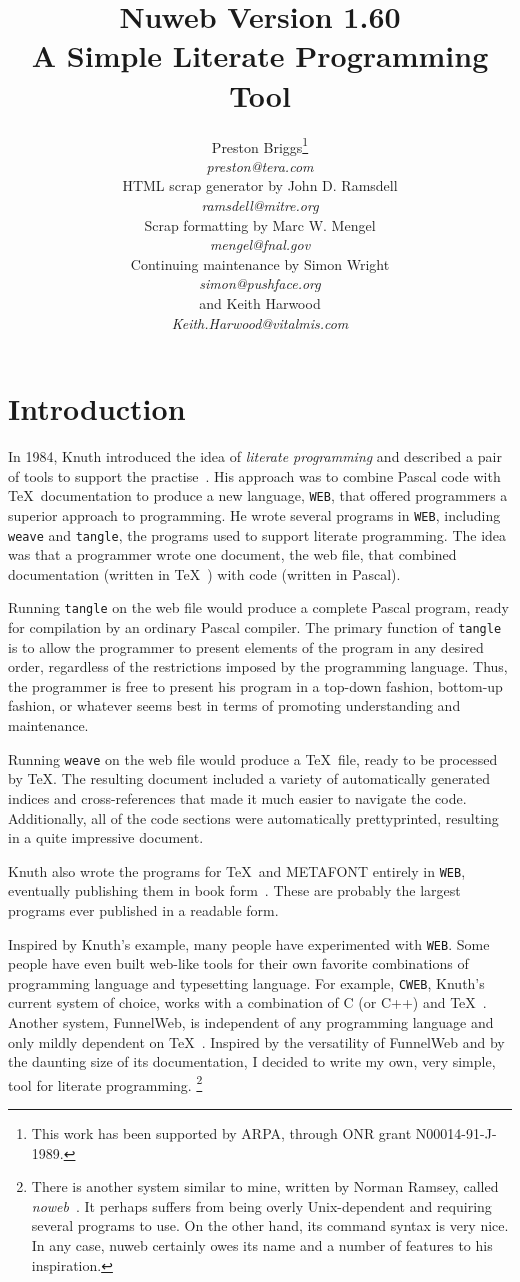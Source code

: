 \documentclass[a4paper]{report}
\title{Nuweb Version 1.60 \\ A Simple Literate Programming Tool}
\date{}
\author{Preston Briggs\thanks{This work has been supported by ARPA,
through ONR grant N00014-91-J-1989.}
\\ {\sl preston@tera.com}
\\ HTML scrap generator by John D. Ramsdell
\\ {\sl ramsdell@mitre.org}
\\ Scrap formatting by Marc W. Mengel
\\ {\sl mengel@fnal.gov}
\\ Continuing maintenance by Simon Wright
\\ {\sl simon@pushface.org}
\\ and Keith Harwood
\\ {\sl Keith.Harwood@vitalmis.com}}
\begin{document}
\maketitle
\tableofcontents

\chapter{Introduction}

In 1984, Knuth introduced the idea of {\em literate programming\/} and
described a pair of tools to support the practise~\cite{Knuth:CJ-27-2-97}.
His approach was to combine Pascal code with \TeX\ documentation to
produce a new language, \verb|WEB|, that offered programmers a superior
approach to programming. He wrote several programs in \verb|WEB|,
including \verb|weave| and \verb|tangle|, the programs used to support
literate programming.
The idea was that a programmer wrote one document, the web file, that
combined documentation (written in \TeX~\cite{Knuth:ct-a}) with code
(written in Pascal).

Running \verb|tangle| on the web file would produce a complete
Pascal program, ready for compilation by an ordinary Pascal compiler.
The primary function of \verb|tangle| is to allow the programmer to
present elements of the program in any desired order, regardless of
the restrictions imposed by the programming language. Thus, the
programmer is free to present his program in a top-down fashion,
bottom-up fashion, or whatever seems best in terms of promoting
understanding and maintenance.

Running \verb|weave| on the web file would produce a \TeX\ file, ready
to be processed by \TeX\@. The resulting document included a variety of
automatically generated indices and cross-references that made it much
easier to navigate the code. Additionally, all of the code sections
were automatically prettyprinted, resulting in a quite impressive
document.

Knuth also wrote the programs for \TeX\ and {\small\sf METAFONT}
entirely in \verb|WEB|, eventually publishing them in book
form~\cite{Knuth:ct-b,Knuth:ct-d}. These are probably the
largest programs ever published in a readable form.

Inspired by Knuth's example, many people have experimented with
\verb|WEB|\@. Some people have even built web-like tools for their
own favorite combinations of programming language and typesetting
language. For example, \verb|CWEB|, Knuth's current system of choice,
works with a combination of C (or C++) and \TeX~\cite{Levy:TB8-1-12}.
Another system, FunnelWeb, is independent of any programming language
and only mildly dependent on \TeX~\cite{Williams:FUM92}. Inspired by the
versatility of FunnelWeb and by the daunting size of its
documentation, I decided to write my own, very simple, tool for
literate programming.%
\footnote{There is another system similar to
mine, written by Norman Ramsey, called {\em noweb}~\cite{Ramsey:LPT92}. It
perhaps suffers from being overly Unix-dependent and requiring several
programs to use. On the other hand, its command syntax is very nice.
In any case, nuweb certainly owes its name and a number of features to
his inspiration.}
\end{document}
